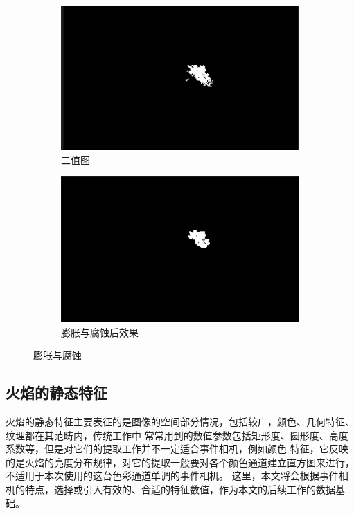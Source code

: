 \begin{figure}[ht]
    \centering
    \begin{subfigure}{0.49\textwidth}
        \centering
        \includegraphics[width=\textwidth]{figures/extract_process_03.png}
        \caption{二值图}
        \label{16.a}
    \end{subfigure}
    \hfill
    \begin{subfigure}{0.49\textwidth}
        \centering
        \includegraphics[width=\textwidth]{figures/extract_process_04.png}
        \caption{膨胀与腐蚀后效果}
        \label{16.b}
    \end{subfigure}
    \caption{膨胀与腐蚀}
    \label{16}
\end{figure}

\subsection{火焰的静态特征}
火焰的静态特征主要表征的是图像的空间部分情况，包括较广，颜色、几何特征、纹理都在其范畴内，传统工作中
常常用到的数值参数包括矩形度、圆形度、高度系数等，但是对它们的提取工作并不一定适合事件相机，例如颜色
特征，它反映的是火焰的亮度分布规律，对它的提取一般要对各个颜色通道建立直方图来进行，不适用于本次使用的这台色彩通道单调的事件相机。
这里，本文将会根据事件相机的特点，选择或引入有效的、合适的特征数值，作为本文的后续工作的数据基础。

